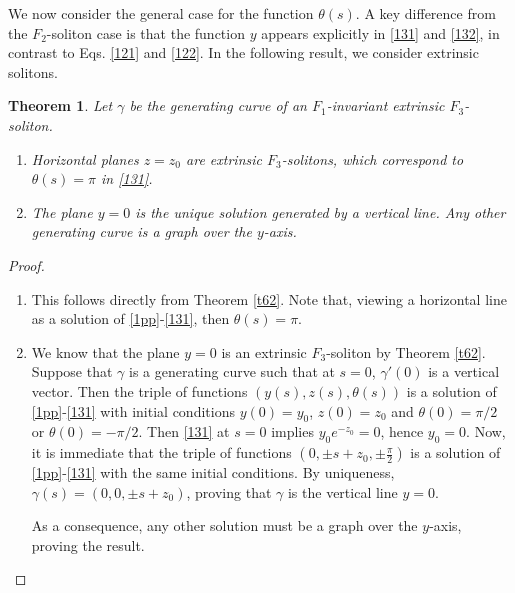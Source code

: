 \documentclass[a4paper,12pt]{amsart}
\theoremstyle{plain}
\newtheorem{theorem}{Theorem}[section]
\theoremstyle{definition}
\begin{document}
 

We now consider the general case for the function $\theta(s)$. A key difference from the $F_2$-soliton case 
is that the function $y$ appears explicitly in \eqref{131} and \eqref{132}, in contrast to 
Eqs. \eqref{121} and \eqref{122}. In the following result, we consider extrinsic solitons.

 


\begin{theorem}\label{t64}
Let $\gamma$ be the generating curve of an $F_1$-invariant extrinsic $F_3$-soliton. 
\begin{enumerate}
 \item Horizontal planes $z = z_0$ are extrinsic $F_3$-solitons, which correspond to $\theta(s)=\pi$ in \eqref{131}.
 \item The plane $y=0$ is the unique solution generated by a vertical line. Any other generating curve is a graph over the $y$-axis. 
 
 \end{enumerate}
\end{theorem}
 
\begin{proof}
\begin{enumerate}
\item This follows directly from Theorem \ref{t62}. Note that, viewing a horizontal line as a solution of \eqref{1pp}-\eqref{131}, then $\theta(s)=\pi$.
\item We know that the plane $y=0$ is an extrinsic $F_3$-soliton by Theorem \ref{t62}. Suppose that $\gamma$ is a generating curve such that at $s=0$, $\gamma'(0)$ is a vertical vector. Then the triple of functions $(y(s),z(s),\theta(s))$ is a solution of \eqref{1pp}-\eqref{131} with initial conditions $y(0)=y_0$, $z(0)=z_0$ and $\theta(0)=\pi/2$ or $\theta(0)=-\pi/2$. Then \eqref{131} at $s=0$ implies $y_0e^{-z_0}=0$, hence $y_0=0$. Now, it is immediate that the triple of functions $(0,\pm s+z_0,\pm\frac{\pi}{2})$ is a solution of \eqref{1pp}-\eqref{131} with the same initial conditions. By uniqueness, $\gamma(s)=(0,0,\pm s+z_0)$, proving that $\gamma$ is the vertical line $y=0$. 

As a consequence, any other solution must be a graph over the $y$-axis, proving the result. 
\end{enumerate}
\end{proof}
\end{document}
